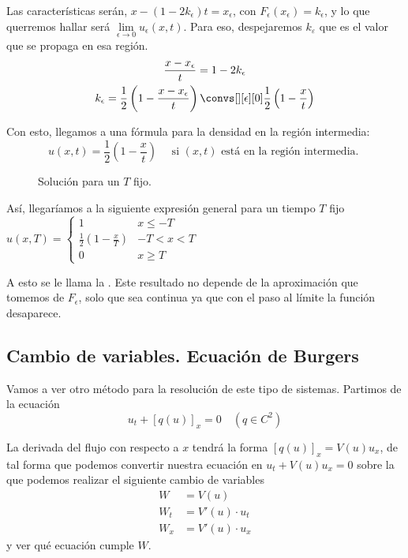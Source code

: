 \begin{example}
				Las características serán,  $x - (1-2k_\epsilon) t = x_\epsilon$, con $F_\epsilon(x_\epsilon) = k_\epsilon$, y lo que querremos hallar será $\lim\limits_{\epsilon \rightarrow 0} u_\epsilon(x,t)$. Para eso, despejaremos $k_ε$ que es el valor que se propaga en esa región.
				\begin{gather*}
				\frac{x - x_\epsilon}{t} = 1-2k_\epsilon \\
				k_\epsilon = \frac{1}{2} \left(1 - \frac{x-x_\epsilon}{t}\right) \convs[][\epsilon][0] \frac{1}{2} \left(1 - \frac{x}{t} \right)
				\end{gather*}

				Con esto, llegamos a una fórmula para la densidad en la región intermedia:
				\[ u(x,t) = \frac{1}{2} \left(1 - \frac{x}{t} \right) \quad \text{ si } (x,t) \text{ está en la región intermedia. } \]

				\begin{figure}[hbtp]
					\centering
					\caption{Solución para un $T$ fijo.}
					\label{fig:SolucionTFijo}
				\end{figure}

				Así, llegaríamos a la siguiente expresión general para un tiempo $T$ fijo
				\( u(x,T) =
				\begin{cases}
					1 & x \leq -T \\
					\frac{1}{2} \left(1 - \frac{x}{T}\right) & -T < x < T \\
					0 & x \geq T
				\end{cases} \label{eq:SolucionRarefaccion}
				\)

				A esto se le llama la . Este resultado no depende de la aproximación que tomemos de $F_\epsilon$, solo que sea continua ya que con el paso al límite la función desaparece.
			\end{example}


	\subsection{Cambio de variables. Ecuación de Burgers}
	\label{sec:EcuacionBurgers}

		Vamos a ver otro método para la resolución de este tipo de sistemas. Partimos de la ecuación
		\[ u_t + [q(u)]_x = 0 \quad (q \in C^2) \]

		La derivada del flujo con respecto a $x$ tendrá la forma $[q(u)]_x = V(u) u_x$, de tal forma que podemos convertir nuestra ecuación en \(
		u_t + V(u)u_x = 0 \label{eq:burgers1} \) sobre la que podemos realizar el siguiente cambio de variables
		\begin{align*}
		W &= V(u) \\
		W_t &= V'(u) \cdot u_t \\
		W_x &= V'(u) \cdot u_x
		\end{align*} y ver qué ecuación cumple $W$.

